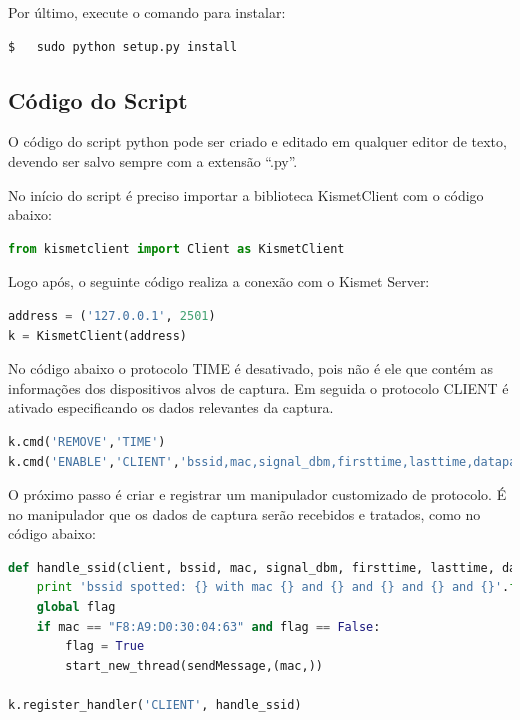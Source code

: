 Por último, execute o comando para instalar: \\

\begin{lstlisting}[language=bash]
$   sudo python setup.py install
\end{lstlisting}

\subsection{Código do Script}
\label{sec:codigo-script}

O código do script python pode ser criado e editado em qualquer editor de texto, devendo ser salvo sempre com a extensão ``.py''.

No início do script é preciso importar a biblioteca KismetClient com o código abaixo: \\

\begin{lstlisting}[language=python]
from kismetclient import Client as KismetClient
\end{lstlisting}

Logo após, o seguinte código realiza a conexão com o Kismet Server: \\

\begin{lstlisting}[language=python]
address = ('127.0.0.1', 2501)
k = KismetClient(address)
\end{lstlisting}

No código abaixo o protocolo TIME é desativado, pois não é ele que contém as informações dos dispositivos alvos de captura. Em seguida o protocolo CLIENT é ativado especificando os dados relevantes da captura. \\

\begin{lstlisting}[language=python]
k.cmd('REMOVE','TIME')
k.cmd('ENABLE','CLIENT','bssid,mac,signal_dbm,firsttime,lasttime,datapackets')
\end{lstlisting}

O próximo passo é criar e registrar um manipulador customizado de protocolo. É no manipulador que os dados de captura serão recebidos e tratados, como no código abaixo: \\

\begin{lstlisting}[language=python]
def handle_ssid(client, bssid, mac, signal_dbm, firsttime, lasttime, datapackets):
	print 'bssid spotted: {} with mac {} and {} and {} and {} and {}'.format(bssid, mac, signal_dbm, time.strftime("%D %H:%M:%S", time.localtime(int(firsttime))), time.strftime("%D %H:%M:%S", time.localtime(int(lasttime))), datapackets)
	global flag
	if mac == "F8:A9:D0:30:04:63" and flag == False:
		flag = True
		start_new_thread(sendMessage,(mac,))

k.register_handler('CLIENT', handle_ssid)
\end{lstlisting}

